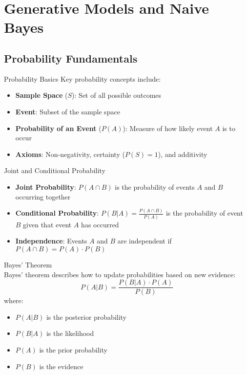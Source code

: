 \section{Generative Models and Naive Bayes}

\subsection{Probability Fundamentals}

\begin{definition}{Probability Basics}
Key probability concepts include:
\begin{itemize}
    \item \textbf{Sample Space} ($S$): Set of all possible outcomes
    \item \textbf{Event}: Subset of the sample space
    \item \textbf{Probability of an Event} ($P(A)$): Measure of how likely event $A$ is to occur
    \item \textbf{Axioms}: Non-negativity, certainty ($P(S) = 1$), and additivity
\end{itemize}
\end{definition}

\begin{definition}{Joint and Conditional Probability}
\begin{itemize}
    \item \textbf{Joint Probability}: $P(A \cap B)$ is the probability of events $A$ and $B$ occurring together
    \item \textbf{Conditional Probability}: $P(B|A) = \frac{P(A \cap B)}{P(A)}$ is the probability of event $B$ given that event $A$ has occurred
    \item \textbf{Independence}: Events $A$ and $B$ are independent if $P(A \cap B) = P(A) \cdot P(B)$
\end{itemize}
\end{definition}


\begin{definition}{Bayes' Theorem}\\
Bayes' theorem describes how to update probabilities based on new evidence:
\[P(A|B) = \frac{P(B|A) \cdot P(A)}{P(B)}\]
where:
\begin{itemize}
    \item $P(A|B)$ is the posterior probability
    \item $P(B|A)$ is the likelihood
    \item $P(A)$ is the prior probability
    \item $P(B)$ is the evidence
\end{itemize}
\end{definition}

